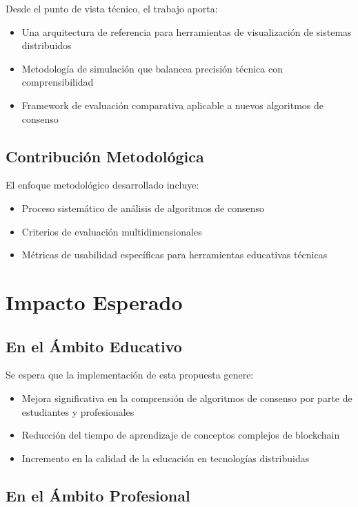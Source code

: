 \documentclass[spanish,12pt,letterpaper]{report}
\begin{document}
Desde el punto de vista técnico, el trabajo aporta:

\begin{itemize}
    \item Una arquitectura de referencia para herramientas de visualización de sistemas distribuidos
    \item Metodología de simulación que balancea precisión técnica con comprensibilidad
    \item Framework de evaluación comparativa aplicable a nuevos algoritmos de consenso
\end{itemize}

\subsection{Contribución Metodológica}

El enfoque metodológico desarrollado incluye:

\begin{itemize}
    \item Proceso sistemático de análisis de algoritmos de consenso
    \item Criterios de evaluación multidimensionales
    \item Métricas de usabilidad específicas para herramientas educativas técnicas
\end{itemize}

\section{Impacto Esperado}

\subsection{En el Ámbito Educativo}

Se espera que la implementación de esta propuesta genere:

\begin{itemize}
    \item Mejora significativa en la comprensión de algoritmos de consenso por parte de estudiantes y profesionales
    \item Reducción del tiempo de aprendizaje de conceptos complejos de blockchain
    \item Incremento en la calidad de la educación en tecnologías distribuidas
\end{itemize}

\subsection{En el Ámbito Profesional}
\end{document}
